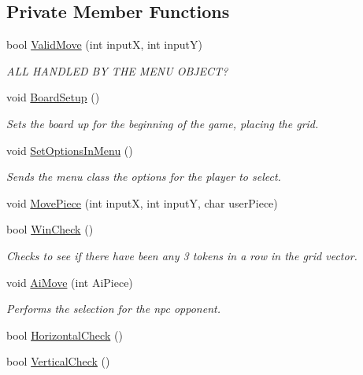 \subsection*{Private Member Functions}
\begin{DoxyCompactItemize}
\item 
bool \hyperlink{classTicTacToe_ab3e52a3c1bb9fefe08f4c4641f8a70f8}{Valid\-Move} (int input\-X, int input\-Y)
\begin{DoxyCompactList}\small\item\em A\-L\-L H\-A\-N\-D\-L\-E\-D B\-Y T\-H\-E M\-E\-N\-U O\-B\-J\-E\-C\-T? \end{DoxyCompactList}\item 
void \hyperlink{classTicTacToe_a5a03afaffde20d826472e7a8e27995e4}{Board\-Setup} ()
\begin{DoxyCompactList}\small\item\em Sets the board up for the beginning of the game, placing the grid. \end{DoxyCompactList}\item 
void \hyperlink{classTicTacToe_a5fd34a83c96edbcf3c3c5a0930d513fb}{Set\-Options\-In\-Menu} ()
\begin{DoxyCompactList}\small\item\em Sends the menu class the options for the player to select. \end{DoxyCompactList}\item 
void \hyperlink{classTicTacToe_afb236f340525d12a81667a340440b210}{Move\-Piece} (int input\-X, int input\-Y, char user\-Piece)
\item 
bool \hyperlink{classTicTacToe_afe8f0ecd818f9f6b8418b7e597ff56a7}{Win\-Check} ()
\begin{DoxyCompactList}\small\item\em Checks to see if there have been any 3 tokens in a row in the grid vector. \end{DoxyCompactList}\item 
void \hyperlink{classTicTacToe_a27e5e7df0e76940c43f5c9fd83da5b75}{Ai\-Move} (int Ai\-Piece)
\begin{DoxyCompactList}\small\item\em Performs the selection for the npc opponent. \end{DoxyCompactList}\item 
bool \hyperlink{classTicTacToe_afce358eabb849ae0dbf55818a7bdc56b}{Horizontal\-Check} ()
\item 
bool \hyperlink{classTicTacToe_aff214a5737d06961a5f6a14cf97ed1fe}{Vertical\-Check} ()

\end{DoxyCompactItemize}
